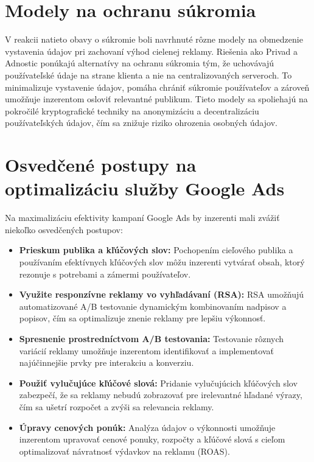 \documentclass[10pt,slovak,a4paper]{article}
\begin{document}
\section{Modely na ochranu súkromia}
V reakcii natieto obavy o súkromie boli navrhnuté rôzne modely na obmedzenie vystavenia údajov pri zachovaní výhod 
cielenej reklamy. Riešenia ako Privad a Adnostic ponúkajú alternatívy na ochranu súkromia tým, že uchovávajú 
používateľské údaje na strane klienta a nie na centralizovaných serveroch. To minimalizuje vystavenie údajov, 
pomáha chrániť súkromie používateľov a zároveň umožňuje inzerentom osloviť relevantné publikum. Tieto modely sa 
spoliehajú na pokročilé kryptografické techniky na anonymizáciu a decentralizáciu používateľských údajov, čím sa 
znižuje riziko ohrozenia osobných údajov.

\section{Osvedčené postupy na optimalizáciu služby Google Ads}
Na maximalizáciu efektivity kampaní Google Ads by inzerenti mali zvážiť niekoľko osvedčených postupov:

\begin{itemize}
    \item \textbf{Prieskum publika a kľúčových slov:} Pochopením cieľového publika a používaním efektívnych kľúčových 
    slov môžu inzerenti vytvárať obsah, ktorý rezonuje s potrebami a zámermi používateľov.
    \item \textbf{Využite responzívne reklamy vo vyhľadávaní (RSA):} RSA umožňujú automatizované A/B testovanie 
    dynamickým kombinovaním nadpisov a popisov, čím sa optimalizuje znenie reklamy pre lepšiu výkonnosť.
    \item \textbf{Spresnenie prostredníctvom A/B testovania:} Testovanie rôznych variácií reklamy umožňuje inzerentom 
    identifikovať a implementovať najúčinnejšie prvky pre interakciu a konverziu.
    \item \textbf{Použiť vylučujúce kľúčové slová:} Pridanie vylučujúcich kľúčových slov zabezpečí, že sa reklamy 
    nebudú zobrazovať pre irelevantné hľadané výrazy, čím sa ušetrí rozpočet a zvýši sa relevancia reklamy.
    \item \textbf{Úpravy cenových ponúk:} Analýza údajov o výkonnosti umožňuje inzerentom upravovať cenové ponuky, 
    rozpočty a kľúčové slová s cieľom optimalizovať návratnosť výdavkov na reklamu (ROAS).
\end{itemize}



\end{document}
